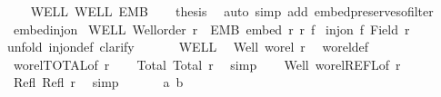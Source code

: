 \begin{isabellebody}
\ \ \isamarkupfalse%
\ WELL\ WELL{\isacharprime}{\kern0pt}\ EMB\isanewline
\ \ \isamarkupfalse%
\ {\isacharquery}{\kern0pt}thesis\ \isamarkupfalse%
\ {\isacharparenleft}{\kern0pt}auto\ simp\ add{\isacharcolon}{\kern0pt}\ embed{\isacharunderscore}{\kern0pt}preserves{\isacharunderscore}{\kern0pt}ofilter{\isacharparenright}{\kern0pt}\isanewline
{}\isamarkupfalse%
%
\endisatagproof
{\isafoldproof}%
%
\isadelimproof
\isanewline
%
\endisadelimproof
\isanewline
{}\isamarkupfalse%
\ embed{\isacharunderscore}{\kern0pt}inj{\isacharunderscore}{\kern0pt}on{\isacharcolon}{\kern0pt}\isanewline
{}\ WELL{\isacharcolon}{\kern0pt}\ {\isachardoublequoteopen}Well{\isacharunderscore}{\kern0pt}order\ r{\isachardoublequoteclose}\ \ EMB{\isacharcolon}{\kern0pt}\ {\isachardoublequoteopen}embed\ r\ r{\isacharprime}{\kern0pt}\ f{\isachardoublequoteclose}\isanewline
{}\ {\isachardoublequoteopen}inj{\isacharunderscore}{\kern0pt}on\ f\ {\isacharparenleft}{\kern0pt}Field\ r{\isacharparenright}{\kern0pt}{\isachardoublequoteclose}\isanewline
%
\isadelimproof
%
\endisadelimproof
%
\isatagproof
{}\isamarkupfalse%
{\isacharparenleft}{\kern0pt}unfold\ inj{\isacharunderscore}{\kern0pt}on{\isacharunderscore}{\kern0pt}def{\isacharcomma}{\kern0pt}\ clarify{\isacharparenright}{\kern0pt}\isanewline
\ \ \isanewline
\ \ \isamarkupfalse%
\ WELL\ \isamarkupfalse%
\ Well{\isacharcolon}{\kern0pt}\ {\isachardoublequoteopen}wo{\isacharunderscore}{\kern0pt}rel\ r{\isachardoublequoteclose}\ \isamarkupfalse%
\ wo{\isacharunderscore}{\kern0pt}rel{\isacharunderscore}{\kern0pt}def\ \isacommand{{\isachardot}{\kern0pt}}\isamarkupfalse%
\isanewline
\ \ \isamarkupfalse%
\ wo{\isacharunderscore}{\kern0pt}rel{\isachardot}{\kern0pt}TOTAL{\isacharbrackleft}{\kern0pt}of\ r{\isacharbrackright}{\kern0pt}\isanewline
\ \ \isamarkupfalse%
\ Total{\isacharcolon}{\kern0pt}\ {\isachardoublequoteopen}Total\ r{\isachardoublequoteclose}\ \isamarkupfalse%
\ simp\isanewline
\ \ \isamarkupfalse%
\ Well\ wo{\isacharunderscore}{\kern0pt}rel{\isachardot}{\kern0pt}REFL{\isacharbrackleft}{\kern0pt}of\ r{\isacharbrackright}{\kern0pt}\isanewline
\ \ \isamarkupfalse%
\ Refl{\isacharcolon}{\kern0pt}\ {\isachardoublequoteopen}Refl\ r{\isachardoublequoteclose}\ \isamarkupfalse%
\ simp\isanewline
\ \ \isanewline
\ \ \isamarkupfalse%
\ a\ b\isanewline

\end{isabellebody}
